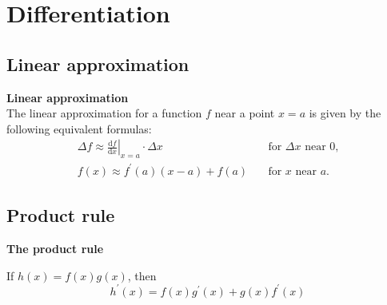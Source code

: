 \chapter{Differentiation}
\section{Linear approximation}
\textbf{Linear approximation}\\
\indent The linear approximation for a function \(f\) near a point \(x=a\) is given by the following equivalent formulas:
\begin{align*}
    \Delta f\approx\left.\frac{\mathrm{d}f}{\mathrm{d}x}\right|_{x=a}\cdot\Delta x & \quad\text{for $\Delta x$ near $0$,}\\
        f(x)\approx f^\prime(a)(x-a)+f(a) & \quad\text{for $x$ near $a$.}
\end{align*}

\section{Product rule}
\textbf{The product rule}

If $h(x)=f(x)g(x)$, then
$$
h^\prime (x)=f(x)g^\prime (x)+g(x)f^\prime (x)
$$

